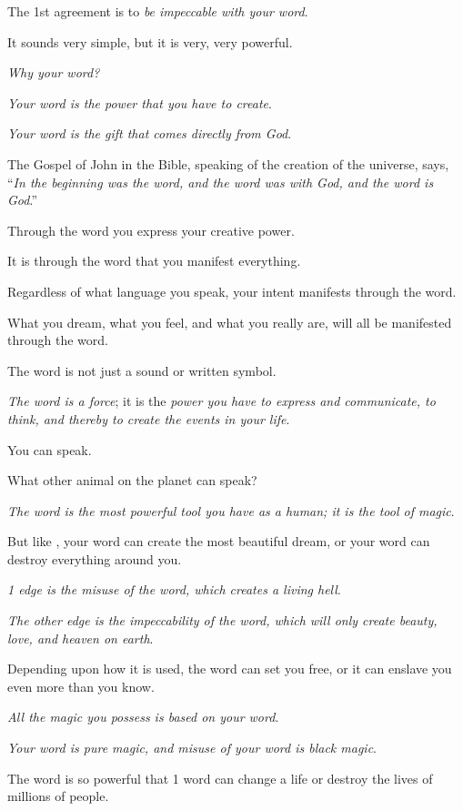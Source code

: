 \documentclass{article}
\numberwithin{equation}{section}
\begin{document}
%
The 1st agreement is to \textit{be impeccable with your word}.

It sounds very simple, but it is very, very powerful.

%
\textit{Why your word?}

\textit{Your word is the power that you have to create}.

\textit{Your word is the gift that comes directly from God}.

The Gospel of John in the Bible, speaking of the creation of the universe, says, ``\textit{In the beginning was the word, and the word was with God, and the word is God}.''

Through the word you express your creative power.

It is through the word that you manifest everything.

Regardless of what language you speak, your intent manifests through the word.

What you dream, what you feel, and what you really are, will all be manifested through the word.

%
The word is not just a sound or written symbol.

\textit{The word is a force}; it is the \textit{power you have to express and communicate, to think, and thereby to create the events in your life}.

You can speak.

What other animal on the planet can speak?

\textit{The word is the most powerful tool you have as a human; it is the tool of magic}.

But like , your word can create the most beautiful dream, or your word can destroy everything around you.

\textit{1 edge is the misuse of the word, which creates a living hell}.

\textit{The other edge is the impeccability of the word, which will only create beauty, love, and heaven on earth}.

Depending upon how it is used, the word can set you free, or it can enslave you even more than you know.

\textit{All the magic you possess is based on your word}.

\textit{Your word is pure magic, and misuse of your word is black magic}.

%
The word is so powerful that 1 word can change a life or destroy the lives of millions of people.
\end{document}
